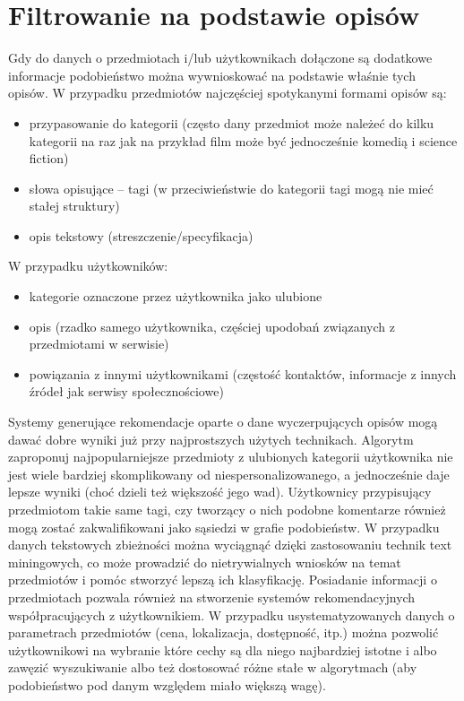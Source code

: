 \documentclass{pracamgr}
\begin{document}
  \section{Filtrowanie na podstawie opisów}
   Gdy do danych o przedmiotach i/lub użytkownikach dołączone są dodatkowe informacje podobieństwo
   można wywnioskować na podstawie właśnie tych opisów.\newline
   W przypadku przedmiotów najczęściej spotykanymi formami opisów są:
   \begin{itemize}\itemsep1pt \parskip0pt 
    \item przypasowanie do kategorii
     (często dany przedmiot może należeć do kilku kategorii na raz jak na przykład film może być jednocześnie komedią i science fiction)
    \item słowa opisujące -- tagi (w przeciwieństwie do kategorii tagi mogą nie mieć stałej struktury)
    \item opis tekstowy (streszczenie/specyfikacja)
   \end{itemize}
   W przypadku użytkowników:
   \begin{itemize}\itemsep1pt \parskip0pt 
    \item kategorie oznaczone przez użytkownika jako ulubione
    \item opis (rzadko samego użytkownika, częściej upodobań związanych z przedmiotami w serwisie)
    \item powiązania z innymi użytkownikami (częstość kontaktów, informacje z innych źródeł jak serwisy społecznościowe)
   \end{itemize}
   Systemy generujące rekomendacje oparte o dane wyczerpujących opisów mogą dawać dobre wyniki już przy najprostszych użytych technikach.
   Algorytm zaproponuj najpopularniejsze przedmioty z ulubionych kategorii użytkownika nie jest wiele bardziej skomplikowany od niespersonalizowanego,
   a jednocześnie daje lepsze wyniki (choć dzieli też większość jego wad).
   Użytkownicy przypisujący przedmiotom takie same tagi, czy tworzący o
   nich podobne komentarze również mogą zostać zakwalifikowani jako sąsiedzi w grafie podobieństw.
   W przypadku danych tekstowych zbieżności można wyciągnąć dzięki zastosowaniu technik text miningowych,
   co może prowadzić do nietrywialnych wniosków na temat przedmiotów i pomóc stworzyć lepszą ich klasyfikację.\newline
   Posiadanie informacji o przedmiotach pozwala również na stworzenie systemów rekomendacyjnych współpracujących z użytkownikiem.
   W przypadku usystematyzowanych danych o parametrach przedmiotów (cena, lokalizacja, dostępność, itp.)
   można pozwolić użytkownikowi na wybranie które cechy są dla niego najbardziej istotne i albo zawęzić wyszukiwanie albo też
   dostosować różne stałe w algorytmach (aby podobieństwo pod danym względem miało większą wagę).
\end{document}
